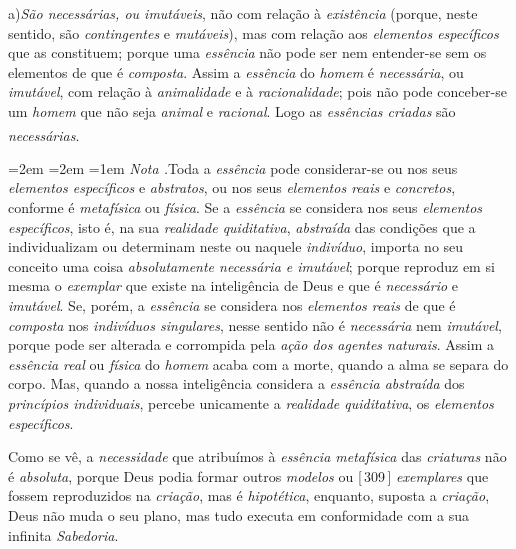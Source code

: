 \documentclass[12pt,a4paper]{article}
\newcommand{\pg}[1]{\thinspace\textup{[\,#1\,]}\thinspace}
\newcommand{\sub}[2]{\medskip\noindent#1)\quad\emph{#2},\;\textemdash\;}
\renewcommand\footnote[1]{%
    \stepcounter{footnote}\textsuperscript{\thefootnote}%
    \par
    {\footnotesize
     \leftskip=2em \rightskip=2em \parindent=1em
     \addvspace{\medskipamount}%
     \noindent\textit{Nota \thefootnote.}\enspace #1\par
     \addvspace{\medskipamount}}%
  }
\begin{document}
\sub{a}{São necessárias, ou imutáveis} não com relação à \emph{existência}
(porque, neste sentido, são \emph{contingentes} e \emph{mutáveis}),
\textemdash{} mas com relação aos \emph{elementos específicos} que as
constituem; porque uma \emph{essência} não pode ser nem entender-se sem os
elementos de que é \emph{composta}. Assim a \emph{essência} do \emph{homem} é
\emph{necessária}, ou \emph{imutável}, com relação à \emph{animalidade} e à
\emph{racionalidade}; pois não pode conceber-se um \emph{homem} que não seja
\emph{animal} e \emph{racional}. Logo as \emph{essências criadas} são
\emph{necessárias}.\footnote{Toda a \emph{essência} pode considerar-se
\textemdash{} ou nos seus \emph{elementos específicos} e \emph{abstratos},
\textemdash{} ou nos seus \emph{elementos reais} e \emph{concretos}, conforme é
\emph{metafísica} ou \emph{física}. \textemdash{} Se a \emph{essência} se
considera nos seus \emph{elementos específicos}, isto é, na sua \emph{realidade
quiditativa}, \emph{abstraída} das condições que a individualizam ou determinam
neste ou naquele \emph{indivíduo}, importa no seu conceito uma coisa
\emph{absolutamente necessária e imutável}; porque reproduz em si mesma o
\emph{exemplar} que existe na inteligência de Deus e que é \emph{necessário} e
\emph{imutável}. \textemdash{} Se, porém, a \emph{essência} se considera nos
\emph{elementos reais} de que é \emph{composta} nos \emph{indivíduos
singulares}, nesse sentido não é \emph{necessária} nem \emph{imutável}, porque
pode ser alterada e corrompida pela \emph{ação dos agentes naturais}. Assim a
\emph{essência real} ou \emph{física} do \emph{homem} acaba com a morte, quando
a alma se separa do corpo. \textemdash{} Mas, quando a nossa inteligência
considera a \emph{essência abstraída} dos \emph{princípios individuais},
percebe unicamente a \emph{realidade quiditativa}, os \emph{elementos
específicos}.

  Como se vê, a \emph{necessidade} que atribuímos à \emph{essência metafísica}
  das \emph{criaturas} \textemdash{} não é \emph{absoluta}, porque Deus podia
  formar outros \emph{modelos} ou \pg{309} \emph{exemplares} que fossem
  reproduzidos na \emph{criação}, \textemdash{} mas é \emph{hipotética},
  enquanto, suposta a \emph{criação}, Deus não muda o seu plano, mas tudo
  executa em conformidade com a sua infinita \emph{Sabedoria}.}
\end{document}
